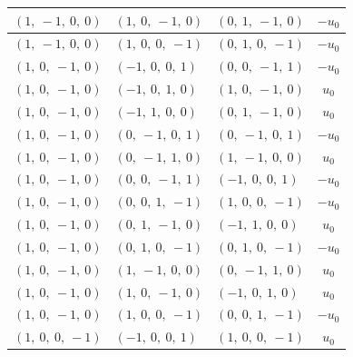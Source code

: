 \documentclass[11pt]{article}
\theoremstyle{definition}
\begin{document}
\begin{longtable}{|l|l|l|c|}
    \hline
    $\left( 1, \  -1, \  0, \  0\right)$ & $\left( 1, \  0, \  -1, \  0\right)$ & $\left( 0, \  1, \  -1, \  0\right)$ & $- u_{0}$ \\
    \hline
    $\left( 1, \  -1, \  0, \  0\right)$ & $\left( 1, \  0, \  0, \  -1\right)$ & $\left( 0, \  1, \  0, \  -1\right)$ & $- u_{0}$ \\
    \hline
    $\left( 1, \  0, \  -1, \  0\right)$ & $\left( -1, \  0, \  0, \  1\right)$ & $\left( 0, \  0, \  -1, \  1\right)$ & $- u_{0}$ \\
    \hline
    $\left( 1, \  0, \  -1, \  0\right)$ & $\left( -1, \  0, \  1, \  0\right)$ & $\left( 1, \  0, \  -1, \  0\right)$ & $u_{0}$ \\
    \hline
    $\left( 1, \  0, \  -1, \  0\right)$ & $\left( -1, \  1, \  0, \  0\right)$ & $\left( 0, \  1, \  -1, \  0\right)$ & $u_{0}$ \\
    \hline
    $\left( 1, \  0, \  -1, \  0\right)$ & $\left( 0, \  -1, \  0, \  1\right)$ & $\left( 0, \  -1, \  0, \  1\right)$ & $- u_{0}$ \\
    \hline
    $\left( 1, \  0, \  -1, \  0\right)$ & $\left( 0, \  -1, \  1, \  0\right)$ & $\left( 1, \  -1, \  0, \  0\right)$ & $u_{0}$ \\
    \hline
    $\left( 1, \  0, \  -1, \  0\right)$ & $\left( 0, \  0, \  -1, \  1\right)$ & $\left( -1, \  0, \  0, \  1\right)$ & $- u_{0}$ \\
    \hline
    $\left( 1, \  0, \  -1, \  0\right)$ & $\left( 0, \  0, \  1, \  -1\right)$ & $\left( 1, \  0, \  0, \  -1\right)$ & $- u_{0}$ \\
    \hline
    $\left( 1, \  0, \  -1, \  0\right)$ & $\left( 0, \  1, \  -1, \  0\right)$ & $\left( -1, \  1, \  0, \  0\right)$ & $u_{0}$ \\
    \hline
    $\left( 1, \  0, \  -1, \  0\right)$ & $\left( 0, \  1, \  0, \  -1\right)$ & $\left( 0, \  1, \  0, \  -1\right)$ & $- u_{0}$ \\
    \hline
    $\left( 1, \  0, \  -1, \  0\right)$ & $\left( 1, \  -1, \  0, \  0\right)$ & $\left( 0, \  -1, \  1, \  0\right)$ & $u_{0}$ \\
    \hline
    $\left( 1, \  0, \  -1, \  0\right)$ & $\left( 1, \  0, \  -1, \  0\right)$ & $\left( -1, \  0, \  1, \  0\right)$ & $u_{0}$ \\
    \hline
    $\left( 1, \  0, \  -1, \  0\right)$ & $\left( 1, \  0, \  0, \  -1\right)$ & $\left( 0, \  0, \  1, \  -1\right)$ & $- u_{0}$ \\
    \hline
    $\left( 1, \  0, \  0, \  -1\right)$ & $\left( -1, \  0, \  0, \  1\right)$ & $\left( 1, \  0, \  0, \  -1\right)$ & $u_{0}$ \\

\end{longtable}
\end{document}
